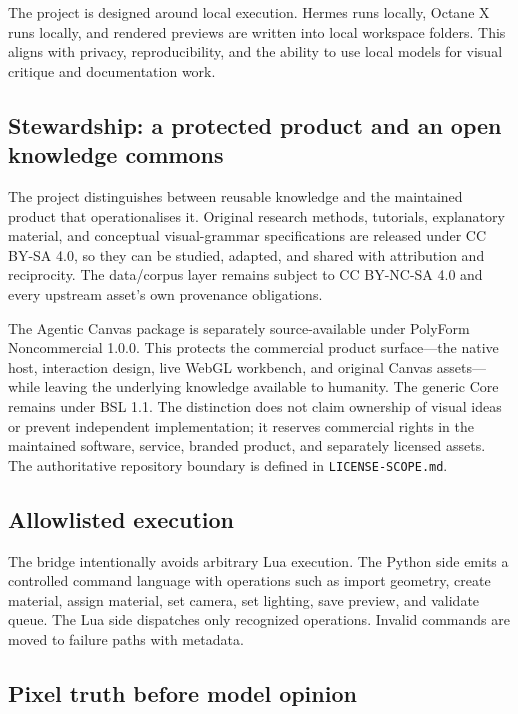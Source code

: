 \documentclass[11pt,a4paper]{article}
\begin{document}
The project is designed around local execution. Hermes runs locally, Octane X runs locally, and rendered previews are written into local workspace folders. This aligns with privacy, reproducibility, and the ability to use local models for visual critique and documentation work.

\subsection{Stewardship: a protected product and an open knowledge commons}

The project distinguishes between reusable knowledge and the maintained product
that operationalises it. Original research methods, tutorials, explanatory
material, and conceptual visual-grammar specifications are released under CC
BY-SA 4.0, so they can be studied, adapted, and shared with attribution and
reciprocity. The data/corpus layer remains subject to CC BY-NC-SA 4.0 and every
upstream asset's own provenance obligations.

The Agentic Canvas package is separately source-available under PolyForm
Noncommercial 1.0.0. This protects the commercial product surface---the native
host, interaction design, live WebGL workbench, and original Canvas assets---
while leaving the underlying knowledge available to humanity. The generic Core
remains under BSL 1.1. The distinction does not claim ownership of visual ideas
or prevent independent implementation; it reserves commercial rights in the
maintained software, service, branded product, and separately licensed assets.
The authoritative repository boundary is defined in \texttt{LICENSE-SCOPE.md}.

\subsection{Allowlisted execution}

The bridge intentionally avoids arbitrary Lua execution. The Python side emits a controlled command language with operations such as import geometry, create material, assign material, set camera, set lighting, save preview, and validate queue. The Lua side dispatches only recognized operations. Invalid commands are moved to failure paths with metadata.

\subsection{Pixel truth before model opinion}
\end{document}
